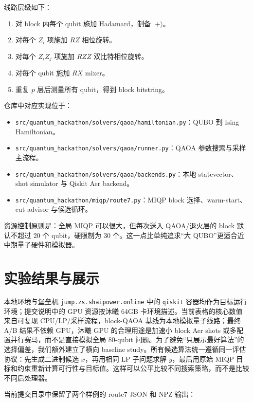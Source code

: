 \documentclass[UTF8,a4paper,11pt]{ctexart}
\begin{document}
线路层级如下：

\begin{enumerate}
  \item 对 block 内每个 qubit 施加 Hadamard，制备 $|+\rangle$。
  \item 对每个 $Z_i$ 项施加 $RZ$ 相位旋转。
  \item 对每个 $Z_iZ_j$ 项施加 $RZZ$ 双比特相位旋转。
  \item 对每个 qubit 施加 $RX$ mixer。
  \item 重复 $p$ 层后测量所有 qubit，得到 block bitstring。
\end{enumerate}

仓库中对应实现位于：

\begin{itemize}
  \item \texttt{src/quantum\_hackathon/solvers/qaoa/hamiltonian.py}：QUBO 到 Ising Hamiltonian。
  \item \texttt{src/quantum\_hackathon/solvers/qaoa/runner.py}：QAOA 参数搜索与采样主流程。
  \item \texttt{src/quantum\_hackathon/solvers/qaoa/backends.py}：本地 statevector、shot simulator 与 Qiskit Aer backend。
  \item \texttt{src/quantum\_hackathon/miqp/route7.py}：MIQP block 选择、warm-start、cut advisor 与候选循环。
\end{itemize}

资源控制原则是：全局 MIQP 可以很大，但每次送入 QAOA/退火层的 block 默认不超过 20 个 qubit，硬限制为 30 个。这一点比单纯追求“大 QUBO”更适合近中期量子硬件和模拟器。

\section{实验结果与展示}

本地环境与堡垒机 \texttt{jump.zs.shaipower.online} 中的 \texttt{qiskit} 容器均作为目标运行环境；提交说明中的 GPU 资源按沐曦 64GB 卡环境描述。当前表格的核心数值来自可复现 CPU/LP/采样流程，block-QAOA 基线为本地模拟量子线路；最终 A/B 结果不依赖 GPU，沐曦 GPU 的合理用途是加速小 block Aer shots 或多配置并行赛马，而不是直接模拟全局 80-qubit 问题。为了避免“只展示最好算法”的选择偏差，我们额外建立了横向 baseline study。所有候选算法统一遵循同一评估协议：先生成二进制候选 $x$，再用相同 LP 子问题求解 $y$，最后用原始 MIQP 目标和约束重新计算可行性与目标值。这样可以公平比较不同搜索策略，而不是比较不同后处理器。

当前提交目录中保留了两个样例的 route7 JSON 和 NPZ 输出：
\end{document}

